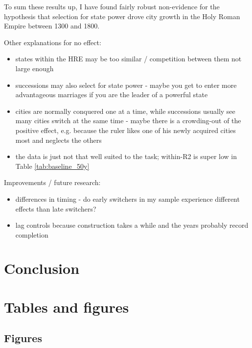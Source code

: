 \documentclass[11pt, a4paper]{article}
\newcommand{\decoline}{%
  \par
  \vspace{\baselineskip}
  \hfill
  {\Large*}
  \hfill
  \vspace{\baselineskip}
\par}
\begin{document}
\decoline

To sum these results up, I have found fairly robust non-evidence for the hypothesis that selection for state power drove city growth in the Holy Roman Empire between 1300 and 1800. 

Other explanations for no effect:
\begin{itemize}
    \item states within the HRE may be too similar / competition between them not large enough
    \item successions may also select for state power - maybe you get to enter more advantageous marriages if you are the leader of a powerful state
    \item cities are normally conquered one at a time, while successions usually see many cities switch at the same time - maybe there is a crowding-out of the positive effect, e.g. because the ruler likes one of his newly acquired cities most and neglects the others
    \item the data is just not that well suited to the task; within-R2 is super low in Table \ref{tab:baseline_50y}
\end{itemize}

Improvements / future research:
\begin{itemize}
    \item differences in timing - do early switchers in my sample experience different effects than late switchers?
    \item lag controls because construction takes a while and the years probably record completion
\end{itemize}



\section{Conclusion} \label{sec:conclusion}

\newpage
\onehalfspacing



\newpage
\section*{Tables and figures}



\subsection*{Figures}
\end{document}
